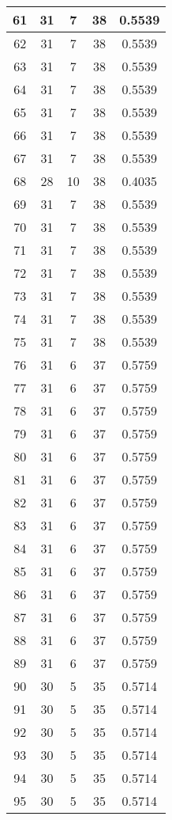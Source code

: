 \documentclass[letterpaper, 12pt]{article}
\begin{document}
\begin{longtable}{|c|c|c|c|c|}
\hline
61 & 31 & 7 & 38 & 0.5539 \\
\hline
62 & 31 & 7 & 38 & 0.5539 \\
\hline
63 & 31 & 7 & 38 & 0.5539 \\
\hline
64 & 31 & 7 & 38 & 0.5539 \\
\hline
65 & 31 & 7 & 38 & 0.5539 \\
\hline
66 & 31 & 7 & 38 & 0.5539 \\
\hline
67 & 31 & 7 & 38 & 0.5539 \\
\hline
68 & 28 & 10 & 38 & 0.4035 \\
\hline
69 & 31 & 7 & 38 & 0.5539 \\
\hline
70 & 31 & 7 & 38 & 0.5539 \\
\hline
71 & 31 & 7 & 38 & 0.5539 \\
\hline
72 & 31 & 7 & 38 & 0.5539 \\
\hline
73 & 31 & 7 & 38 & 0.5539 \\
\hline
74 & 31 & 7 & 38 & 0.5539 \\
\hline
75 & 31 & 7 & 38 & 0.5539 \\
\hline
76 & 31 & 6 & 37 & 0.5759 \\
\hline
77 & 31 & 6 & 37 & 0.5759 \\
\hline
78 & 31 & 6 & 37 & 0.5759 \\
\hline
79 & 31 & 6 & 37 & 0.5759 \\
\hline
80 & 31 & 6 & 37 & 0.5759 \\
\hline
81 & 31 & 6 & 37 & 0.5759 \\
\hline
82 & 31 & 6 & 37 & 0.5759 \\
\hline
83 & 31 & 6 & 37 & 0.5759 \\
\hline
84 & 31 & 6 & 37 & 0.5759 \\
\hline
85 & 31 & 6 & 37 & 0.5759 \\
\hline
86 & 31 & 6 & 37 & 0.5759 \\
\hline
87 & 31 & 6 & 37 & 0.5759 \\
\hline
88 & 31 & 6 & 37 & 0.5759 \\
\hline
89 & 31 & 6 & 37 & 0.5759 \\
\hline
90 & 30 & 5 & 35 & 0.5714 \\
\hline
91 & 30 & 5 & 35 & 0.5714 \\
\hline
92 & 30 & 5 & 35 & 0.5714 \\
\hline
93 & 30 & 5 & 35 & 0.5714 \\
\hline
94 & 30 & 5 & 35 & 0.5714 \\
\hline
95 & 30 & 5 & 35 & 0.5714 \\

\end{longtable}
\end{document}
